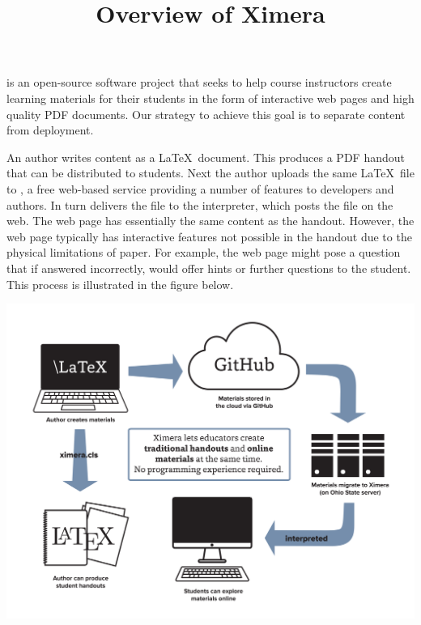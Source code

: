 \documentclass{ximera}
\title{Overview of Ximera}
\begin{document}
\maketitle

\begin{flushright}
\end{flushright}

 is an open-source software project that seeks to help course instructors create learning materials for their students in the form of interactive web pages and high quality PDF documents.
Our strategy to achieve this goal is to separate content from deployment.

An author writes content as a \LaTeX\ document.
This produces a PDF handout that can be distributed to students.
Next the author uploads the same \LaTeX\ file to ,
a free web-based service providing a number of features to developers and authors.
In turn  delivers the file to the  interpreter, which posts the file on the web.
The web page has essentially the same content as the handout.
However, the web page typically has interactive features not possible in the handout due to the physical limitations of paper.
For example, the web page might pose a question that if answered incorrectly, would offer hints or further questions
to the student.
This process is illustrated in the figure below.

\begin{center}
\includegraphics[scale=0.25]{XimeraGraphic.png}
\end{center}
\end{document}
